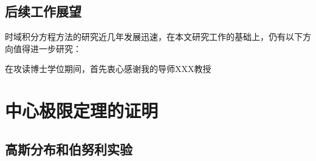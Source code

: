 \documentclass[master]{thesis-uestc}
\begin{document}
\section{后续工作展望}
时域积分方程方法的研究近几年发展迅速，在本文研究工作的基础上，仍有以下方向值得进一步研究：

\thesisacknowledgement
在攻读博士学位期间，首先衷心感谢我的导师XXX教授

\thesisappendix

\chapter{中心极限定理的证明}

\section{高斯分布和伯努利实验}




%
% 
%
% 
% 
%

\end{document}
